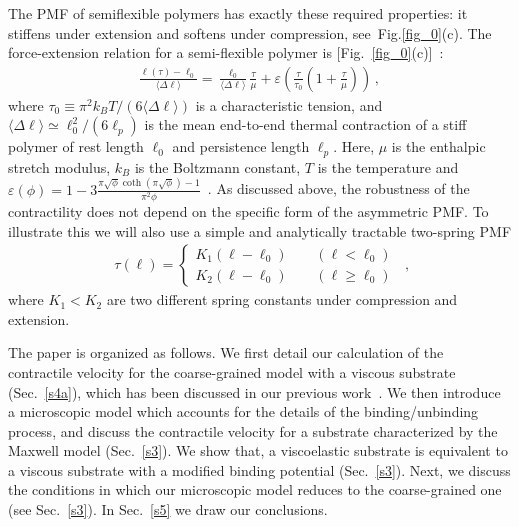 \documentclass[twocolumn,prl,english]{revtex4-1}
\begin{document}
The PMF of semiflexible polymers has exactly these required properties: it stiffens under extension and softens under compression, see~Fig.\ref{fig_0}(c). The force-extension relation for a semi-flexible polymer is [Fig.~\ref{fig_0}(c)]~\cite{MacKintosh1995,Odijk1995,Wilhelm1996,Storm2005191,Broedersz2014}: 
\begin{equation}
\begin{aligned}
\frac{\ell(\tau)-\ell_0}{\langle\Delta\ell\rangle} = \frac{\ell_0 }{\langle\Delta\ell\rangle} \frac{\tau} {\mu} + \varepsilon \left( \frac{\tau}{\tau_0} \left(1+\frac{\tau}{\mu}\right)\right)
\, , 
\end{aligned}
\label{e33}
\end{equation}
%
where 
$\tau_0 \equiv \pi^2 k_B T  /  (6\langle\Delta\ell\rangle)$ is a characteristic tension, and $\langle\Delta\ell\rangle \simeq \ell_0^2/(6\ell_p)$ is the mean end-to-end thermal contraction of a stiff polymer of rest length $\ell_0$ and persistence length $\ell_p$.
Here, $\mu$ is the enthalpic stretch modulus, $k_B$ is the Boltzmann constant, $T$ is the temperature and $\varepsilon(\phi) = 1-3\frac{\pi \sqrt\phi \coth(\pi \sqrt\phi )-1} {\pi^2\phi}$~\cite{Broedersz2014}. As discussed above, the robustness of the contractility does not depend on the specific form of the asymmetric PMF. To illustrate this we will also use a simple and analytically tractable two-spring PMF
\begin{equation}
\begin{aligned}
\tau(\ell)=\left\{ 
\begin{aligned}
K_1(\ell-\ell_0) \qquad(\ell<\ell_0)\\
K_2(\ell-\ell_0) \qquad(\ell\geq \ell_0)
\end{aligned}
\right.
\end{aligned} \, ,
\label{e34}
\end{equation}
where $K_1<K_2$ are two different spring constants under compression and extension. 

The paper is organized as follows. We first detail our calculation of the contractile velocity for the coarse-grained model with a viscous substrate (Sec.~\ref{s4a}), which has been discussed in our previous work~\cite{Chen2020}. We then introduce a microscopic model which accounts for the details of the binding/unbinding process, and discuss the contractile velocity for a substrate characterized by the Maxwell model (Sec.~\ref{s3}). We show that, a viscoelastic substrate is equivalent to a viscous substrate with a modified binding potential (Sec.~\ref{s3}). Next, we discuss the conditions in which our microscopic model reduces to the coarse-grained one (see Sec.~\ref{s3}). In Sec.~\ref{s5} we draw our conclusions. 
\end{document}
